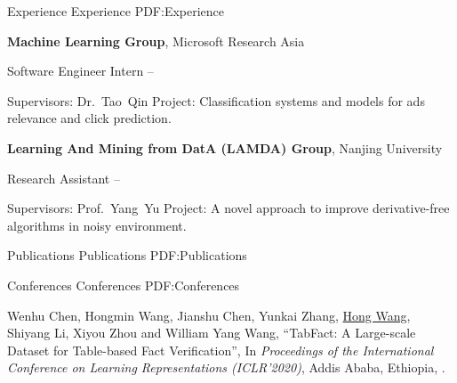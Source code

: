 \documentclass[letterpaper,MMMyyyy,nonstopmode]{simpleresumecv}
\begin{document}
\begin{Body}

\Section
{Experience}
{Experience}
{PDF:Experience}

\Entry
\textbf{Machine Learning Group},
Microsoft Research Asia

\Gap
\BulletItem
Software Engineer Intern
\hfill
{} --
\begin{Detail}
\SubBulletItem
Supervisors:
Dr.~Tao~Qin
\SubBulletItem
Project:
Classification systems and models for ads relevance and click prediction.
\end{Detail}

\BigGap
\Entry
\textbf{Learning And Mining from DatA (LAMDA) Group},
Nanjing University

\Gap
\BulletItem
Research Assistant
\hfill
{} --
\begin{Detail}
\SubBulletItem
Supervisors:
Prof.~Yang~Yu
\SubBulletItem
Project:
A novel approach to improve derivative-free algorithms in noisy environment.
\end{Detail}


\Section
{Publications}
{Publications}
{PDF:Publications}






\BigGap
\SubSection
{Conferences}
{Conferences}
{PDF:Conferences}

\begin{enumerate}[label={[\arabic*]~~}]
\item
Wenhu Chen, Hongmin Wang, Jianshu Chen, Yunkai Zhang, \underline{Hong Wang}, Shiyang Li, Xiyou Zhou and William Yang Wang,
``TabFact: A Large-scale Dataset for Table-based Fact Verification'',
In \textit{Proceedings of the International Conference on Learning Representations (ICLR'2020)}, Addis Ababa, Ethiopia,
.


\end{enumerate}
\end{Body}
\end{document}
